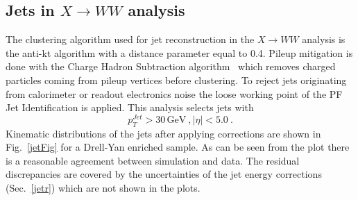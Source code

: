 \subsection*{Jets in $X \to WW$ analysis}
The clustering algorithm used for jet reconstruction in the $X \to WW$ analysis is the anti-kt algorithm with
a distance parameter equal to 0.4. Pileup mitigation is done with the Charge Hadron Subtraction  algorithm~\cite{CMS-PAS-JME-14-001} 
which removes charged particles coming from pileup vertices before
clustering.
To reject jets originating
from calorimeter or readout electronics noise the loose working point of the PF Jet Identification is applied. 
This analysis selects jets with
\begin{equation}
 p_T^{Jet} > 30 \, \mathrm{GeV} \: , |\eta| < 5.0 \: .
\end{equation}
Kinematic distributions of the jets after applying corrections are shown in Fig.~\ref{jetFig} for a Drell-Yan enriched sample.  As can be seen from the plot there is a reasonable agreement between simulation and data. The residual discrepancies are covered by the uncertainties of the jet energy corrections (Sec.~\ref{jetr}) which are not shown in the plots.

